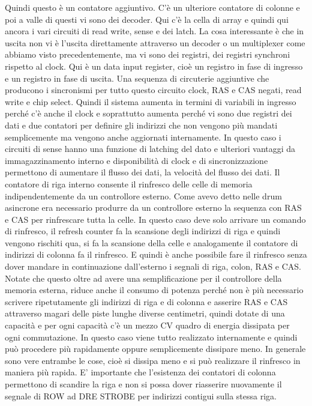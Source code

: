 Quindi questo è un contatore aggiuntivo.
C'è un ulteriore contatore di colonne e poi a valle di questi vi sono dei decoder.
Qui c'è la cella di array e quindi qui ancora i vari circuiti di read write, sense e dei latch.
La cosa interessante è che in uscita non vi è l'uscita direttamente attraverso un decoder o un multiplexer come abbiamo visto precedentemente, ma vi sono dei registri, dei registri synchroni rispetto al clock.
Qui è un data input register, cioè un registro in fase di ingresso e un registro in fase di uscita.
Una sequenza di circuterie aggiuntive che producono i sincronismi per tutto questo circuito clock, RAS e CAS negati, read write e chip select.
Quindi il sistema aumenta in termini di variabili in ingresso perché c'è anche il clock e soprattutto aumenta perché vi sono due registri dei dati e due contatori per definire gli indirizzi che non vengono più mandati semplicemente ma vengono anche aggiornati internamente.
In questo caso i circuiti di sense hanno una funzione di latching del dato e ulteriori vantaggi da immagazzinamento interno e disponibilità di clock e di sincronizzazione permettono di aumentare il flusso dei dati, la velocità del flusso dei dati.
Il contatore di riga interno consente il rinfresco delle celle di memoria indipendentemente da un controllore esterno.
Come avevo detto nelle drum asincrone era necessario produrre da un controllore esterno la sequenza con RAS e CAS per rinfrescare tutta la celle.
In questo caso deve solo arrivare un comando di rinfresco, il refresh counter fa la scansione degli indirizzi di riga e quindi vengono rischiti qua, si fa la scansione della celle e analogamente il contatore di indirizzi di colonna fa il rinfresco.
E quindi è anche possibile fare il rinfresco senza dover mandare in continuazione dall'esterno i segnali di riga, colon, RAS e CAS.
Notate che questo oltre ad avere una semplificazione per il controllore della memoria esterna, riduce anche il consumo di potenza perché non è più necessario scrivere ripetutamente gli indirizzi di riga e di colonna e asserire RAS e CAS attraverso magari delle piste lunghe diverse centimetri, quindi dotate di una capacità e per ogni capacità c'è un mezzo CV quadro di energia dissipata per ogni commutazione.
In questo caso viene tutto realizzato internamente e quindi può procedere più rapidamente oppure semplicemente dissipare meno.
In generale sono vere entrambe le cose, cioè si dissipa meno e si può realizzare il rinfresco in maniera più rapida.
E' importante che l'esistenza dei contatori di colonna permettono di scandire la riga e non si possa dover riasserire nuovamente il segnale di ROW ad DRE STROBE per indirizzi contigui sulla stessa riga.
